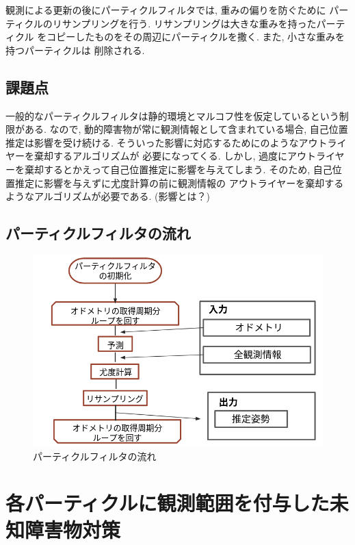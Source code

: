 観測による更新の後にパーティクルフィルタでは, 重みの偏りを防ぐために
パーティクルのリサンプリングを行う. リサンプリングは大きな重みを持ったパーティクル
をコピーしたものをその周辺にパーティクルを撒く. また, 小さな重みを持つパーティクルは
削除される. 

\section{課題点}

一般的なパーティクルフィルタは静的環境とマルコフ性を仮定しているという制限がある. 
なので, 動的障害物が常に観測情報として含まれている場合, 自己位置推定は影響を受け続ける. 
そういった影響に対応するために\cite{赤井2019}のようなアウトライヤーを棄却するアルゴリズムが
必要になってくる. 
しかし, 過度にアウトライヤーを棄却するとかえって自己位置推定に影響を与えてしまう. 
そのため, 自己位置推定に影響を与えずに尤度計算の前に観測情報の
アウトライヤーを棄却するようなアルゴリズムが必要である. (影響とは？)

\newpage
\section{パーティクルフィルタの流れ}
\begin{figure}[h]
  \begin{center}
    \includegraphics[width=1.2\linewidth]{figs/particle_filter_flow.png}
    \caption{パーティクルフィルタの流れ}
    \label{fig:particle_filter_flow}
  \end{center}
\end{figure}

\chapter{各パーティクルに観測範囲を付与した未知障害物対策}
